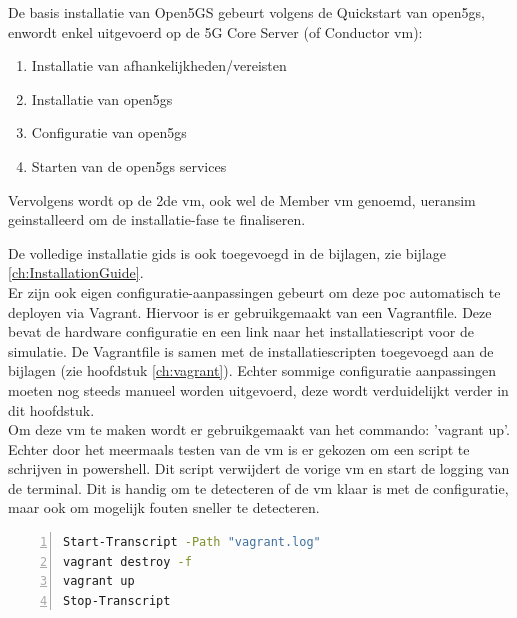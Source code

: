 De basis installatie van Open5GS gebeurt volgens de Quickstart van \gls{open5gs}, \textcite{Lee2025a} enwordt enkel uitgevoerd op de 5G Core Server (of Conductor \gls{vm}):

\begin{enumerate}
    \item Installatie van afhankelijkheden/vereisten
    \item Installatie van \gls{open5gs}
    \item Configuratie van \gls{open5gs}
    \item Starten van de \gls{open5gs} services
\end{enumerate}

Vervolgens wordt op de 2de \gls{vm}, ook wel de Member \gls{vm} genoemd, \gls{ueransim} geinstalleerd om de installatie-fase te finaliseren. 

De volledige installatie gids is ook toegevoegd in de bijlagen, zie bijlage \ref{ch:InstallationGuide}.\\

Er zijn ook eigen configuratie-aanpassingen gebeurt om deze \gls{poc} automatisch te deployen via Vagrant. Hiervoor is er gebruikgemaakt van een Vagrantfile. Deze bevat de hardware configuratie en een link naar het installatiescript voor de simulatie. De Vagrantfile is samen met de installatiescripten toegevoegd aan de bijlagen (zie hoofdstuk \ref{ch:vagrant}). Echter sommige configuratie aanpassingen moeten nog steeds manueel worden uitgevoerd, deze wordt verduidelijkt verder in dit hoofdstuk.\\
Om deze \gls{vm} te maken wordt er gebruikgemaakt van het commando: 'vagrant up'. Echter door het meermaals testen van de \gls{vm} is er gekozen om een script te schrijven in powershell. Dit script verwijdert de vorige \gls{vm} en start de logging van de terminal. Dit is handig om te detecteren of de \gls{vm} klaar is met de configuratie, maar ook om mogelijk fouten sneller te detecteren.

\begin{lstlisting}[basicstyle=\small, frame=single, breaklines=true, postbreak=\mbox{\textcolor{red}{$\hookrightarrow$}\space}, escapeinside ={\%,}, escapechar={!}, numbers=left, language=sh, caption=Build Script]
Start-Transcript -Path "vagrant.log"
vagrant destroy -f
vagrant up
Stop-Transcript
\end{lstlisting}

\section{}%
\label{sec:Config}%

